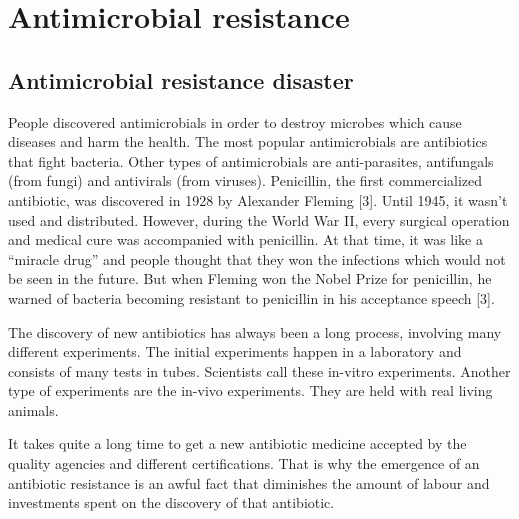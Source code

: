 \chapter{Antimicrobial resistance}

\section{Antimicrobial resistance disaster}

People discovered antimicrobials in order to destroy microbes which cause diseases and harm the health. The most popular antimicrobials are antibiotics that fight bacteria. Other types of antimicrobials are anti-parasites, antifungals (from fungi) and antivirals (from viruses). Penicillin, the first commercialized antibiotic, was discovered in 1928 by Alexander Fleming [3].  Until 1945, it wasn’t used and distributed. However, during the World War II, every surgical operation and medical cure was accompanied with penicillin. At that time, it was like a “miracle drug” and people thought that they won the infections which would not be seen in the future.  But when Fleming won the Nobel Prize for penicillin, he warned of bacteria becoming resistant to penicillin in his acceptance speech [3].

The discovery of new antibiotics has always been a long process, involving many different experiments. The initial experiments happen in a laboratory and consists of many tests in tubes. Scientists call these in-vitro experiments. Another type of experiments are the in-vivo experiments. They are held with real living animals.

It takes quite a long time to get a new antibiotic medicine accepted by the quality agencies and different certifications. That is why the emergence of an antibiotic resistance is an awful fact that diminishes the amount of labour and investments spent on the discovery of that antibiotic.

